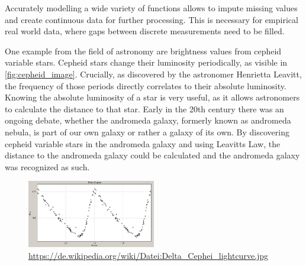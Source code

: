 
Accurately modelling a wide variety of functions allows to impute missing values and create continuous data for further processing. This is necessary for empirical real world data, where gaps between discrete measurements need to be filled. 

One example from the field of astronomy are brightness values from cepheid variable stars. Cepheid stars change their luminosity periodically, as visible in \autoref{fig:cepheid_image}. Crucially, as discovered by the astronomer Henrietta Leavitt, the frequency of those periods directly correlates to their absolute luminosity. Knowing the absolute luminosity of a star is very useful, as it allows astronomers to calculate the distance to that star. Early in the 20th century there was an ongoing debate, whether the andromeda galaxy, formerly known as andromeda nebula, is part of our own galaxy or rather a galaxy of its own. By discovering cepheid variable stars in the andromeda galaxy and using Leavitts Law, the distance to the andromeda galaxy could be calculated and the andromeda galaxy was recognized as such. \cite{gaßnerAstroBook}

\begin{figure}[h]
	\centering
	\includegraphics[width = 0.5\textwidth]{abbildungen/Cephei}
	\caption{\tiny\url{https://de.wikipedia.org/wiki/Datei:Delta_Cephei_lightcurve.jpg}}
	\label{fig:cepheid_image}
\end{figure}


